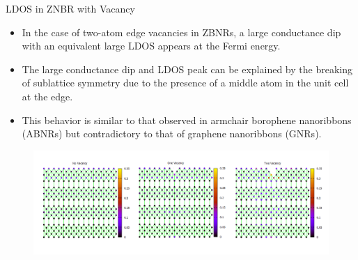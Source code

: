 \documentclass[handout,t]{beamer}
\begin{document}
\begin{frame}{LDOS in ZNBR with Vacancy}
	\begin{itemize}
		\item  In the case of two-atom edge vacancies in ZBNRs, a large conductance dip with an equivalent large LDOS appears at the Fermi energy. 
		\item The large conductance dip and LDOS peak can be explained by the breaking of sublattice symmetry due to the presence of a middle atom in the unit cell at the edge.
		\item  This behavior is similar to that observed in armchair borophene nanoribbons (ABNRs) but contradictory to that of graphene nanoribbons (GNRs).
	\end{itemize}
	\begin{figure}[!ht]
		\centering
		\includegraphics[width=1\linewidth]{../figures/Slide4.PNG}
		\label{zigVSLDOS}
	\end{figure}
\end{frame}
\end{document}

